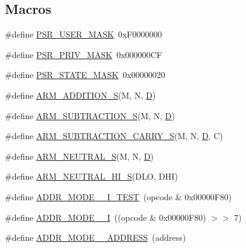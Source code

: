 \subsection*{Macros}
\begin{DoxyCompactItemize}
\item 
\#define \mbox{\hyperlink{isa-arm_8c_a38be3ef0e06b0a3585afaff5b8374ecf}{P\+S\+R\+\_\+\+U\+S\+E\+R\+\_\+\+M\+A\+SK}}~0x\+F0000000
\item 
\#define \mbox{\hyperlink{isa-arm_8c_a808e705b60d550b9aa7f5111d431fc0c}{P\+S\+R\+\_\+\+P\+R\+I\+V\+\_\+\+M\+A\+SK}}~0x000000\+CF
\item 
\#define \mbox{\hyperlink{isa-arm_8c_ae640bd0b96d0e7e17194658d36c3e441}{P\+S\+R\+\_\+\+S\+T\+A\+T\+E\+\_\+\+M\+A\+SK}}~0x00000020
\item 
\#define \mbox{\hyperlink{isa-arm_8c_a8866ca849f0ee866f15627d87ec2a08f}{A\+R\+M\+\_\+\+A\+D\+D\+I\+T\+I\+O\+N\+\_\+S}}(M,  N,  \mbox{\hyperlink{_aes_8c_adef282f11138cda3d081cc21280a8d12}{D}})
\item 
\#define \mbox{\hyperlink{isa-arm_8c_a9f23bfbdae46505fe3d490d8dc82cd2b}{A\+R\+M\+\_\+\+S\+U\+B\+T\+R\+A\+C\+T\+I\+O\+N\+\_\+S}}(M,  N,  \mbox{\hyperlink{_aes_8c_adef282f11138cda3d081cc21280a8d12}{D}})
\item 
\#define \mbox{\hyperlink{isa-arm_8c_aee4a24becc54a3d3a1a570c70ec4566e}{A\+R\+M\+\_\+\+S\+U\+B\+T\+R\+A\+C\+T\+I\+O\+N\+\_\+\+C\+A\+R\+R\+Y\+\_\+S}}(M,  N,  \mbox{\hyperlink{_aes_8c_adef282f11138cda3d081cc21280a8d12}{D}},  C)
\item 
\#define \mbox{\hyperlink{isa-arm_8c_ad836254fbd93d6f5dca83ae0a14b7f73}{A\+R\+M\+\_\+\+N\+E\+U\+T\+R\+A\+L\+\_\+S}}(M,  N,  \mbox{\hyperlink{_aes_8c_adef282f11138cda3d081cc21280a8d12}{D}})
\item 
\#define \mbox{\hyperlink{isa-arm_8c_a11eedb3f96fee00a17773471aa6f2b18}{A\+R\+M\+\_\+\+N\+E\+U\+T\+R\+A\+L\+\_\+\+H\+I\+\_\+S}}(D\+LO,  D\+HI)
\item 
\#define \mbox{\hyperlink{isa-arm_8c_aaeae2827f85b4a89e95d7136db35a6f1}{A\+D\+D\+R\+\_\+\+M\+O\+D\+E\+\_\+\_\+\+I\+\_\+\+T\+E\+ST}}~(opcode \& 0x00000\+F80)
\item 
\#define \mbox{\hyperlink{isa-arm_8c_aab74ad6dee8d6e1d4037dad7928b3514}{A\+D\+D\+R\+\_\+\+M\+O\+D\+E\+\_\+\_\+I}}~((opcode \& 0x00000\+F80) $>$$>$ 7)
\item 
\#define \mbox{\hyperlink{isa-arm_8c_a5d42149c9138a692e6243e1864c90d66}{A\+D\+D\+R\+\_\+\+M\+O\+D\+E\+\_\+\_\+\+A\+D\+D\+R\+E\+SS}}~(address)
\item 
$$
\end{DoxyCompactItemize}
